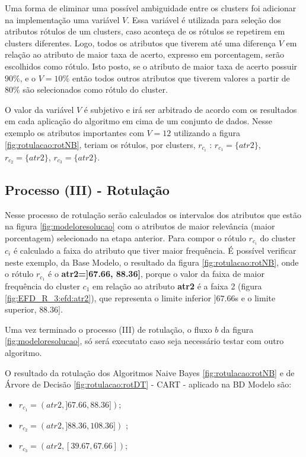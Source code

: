 Uma forma de eliminar uma possível ambiguidade entre os clusters foi adicionar na implementação uma variável  ${V}$. Essa variável é utilizada para seleção dos atributos rótulos de um clusters, caso aconteça de os rótulos se repetirem em clusters diferentes. Logo, todos os atributos que tiverem até uma diferença ${V}$ em relação ao atributo de maior taxa de acerto, expresso em porcentagem, serão escolhidos como rótulo. Isto posto, se o atributo de maior taxa de acerto possuir ${90\%}$, e o ${V=10\%}$  então todos outros atributos que tiverem valores a partir de ${80\%}$ são selecionados como rótulo do cluster.  

O valor da variável ${V}$ é subjetivo e irá ser arbitrado de acordo com os resultados em cada aplicação do algoritmo em cima de um conjunto de dados. Nesse exemplo os atributos importantes com ${V=12}$ utilizando a figura \ref{fig:rotulacao:rotNB}, teriam os rótulos, por clusters, ${r_{c_i}}$ : ${r_{c_1}=\{atr2\}}$, ${r_{c_2}=\{atr2\}}$, ${r_{c_3}=\{atr2\}}$.

\subsection{Processo (III) - Rotulação}

Nesse processo de rotulação serão calculados os intervalos dos atributos que estão na figura \ref{fig:modeloresolucao} com o atributos de maior relevância  (maior porcentagem) selecionado na etapa anterior. Para compor o rótulo ${r_{c_i}}$ do cluster ${c_i}$ é calculado a faixa do atributo  que tiver maior frequência. 
É possível verificar neste exemplo, da Base Modelo, o resultado da figura \ref{fig:rotulacao:rotNB}, onde o rótulo ${r_{c_1}}$ é o  \textbf{atr2=]67.66, 88.36]}, porque o valor da faixa de maior frequência do cluster ${c_1}$ em relação ao atributo \textbf{atr2} é a faixa 2 (figura \ref{fig:EFD_R_3:efd:atr2}), que representa o limite inferior ${]67.66}$s e o limite superior, ${88.36]}$.

Uma vez terminado o processo (III) de rotulação, o fluxo ${b}$ da figura \ref{fig:modeloresolucao}, só será executato caso seja necessário  testar com outro algoritmo.

O resultado da rotulação dos Algoritmos Naive Bayes  \ref{fig:rotulacao:rotNB} e de Árvore de Decisão  \ref{fig:rotulacao:rotDT} - CART - aplicado na BD Modelo são:

\begin{itemize}[noitemsep]
            \item ${r_{c_1}=(atr2,]67.66, 88.36])}$;
            \item ${r_{c_2}=(atr2,]88.36, 108.36])}$ ;
            \item ${r_{c_3}=(atr2,[39.67, 67.66])}$;
            
\end{itemize}

